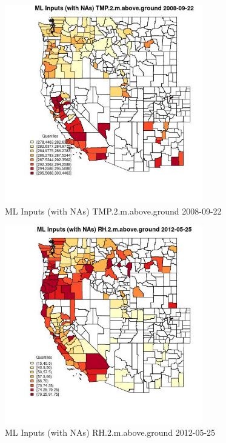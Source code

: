 \begin{figure} 
\centering  
\includegraphics[width=0.77\textwidth]{Code_Outputs/Report_ML_input_PM25_Step4_part_e_de_duplicated_aves_compiled_2019-05-18wNAs_CountyTMP2mabovegroundMean2008-09-22_2008-09-22.jpg} 
\caption{\label{fig:Report_ML_input_PM25_Step4_part_e_de_duplicated_aves_compiled_2019-05-18wNAsCountyTMP2mabovegroundMean2008-09-22_2008-09-22}ML Inputs (with NAs) TMP.2.m.above.ground 2008-09-22} 
\end{figure} 
 

\begin{figure} 
\centering  
\includegraphics[width=0.77\textwidth]{Code_Outputs/Report_ML_input_PM25_Step4_part_e_de_duplicated_aves_compiled_2019-05-18wNAs_CountyRH2mabovegroundMean2012-05-25_2012-05-25.jpg} 
\caption{\label{fig:Report_ML_input_PM25_Step4_part_e_de_duplicated_aves_compiled_2019-05-18wNAsCountyRH2mabovegroundMean2012-05-25_2012-05-25}ML Inputs (with NAs) RH.2.m.above.ground 2012-05-25} 
\end{figure} 
 

